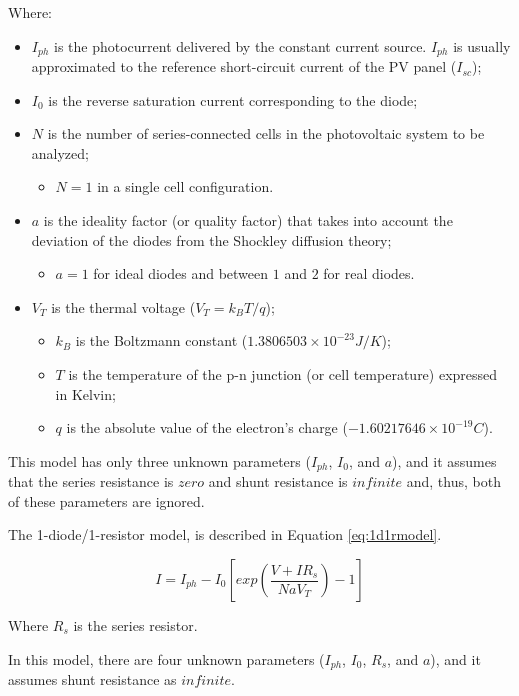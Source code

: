 Where:
\begin{itemize}
\item $I_{ph}$ is the photocurrent delivered by the constant current source. $I_{ph}$ is usually approximated to the reference short-circuit current of the PV panel ($I_{sc}$); 
\item $ I_{0} $ is the reverse saturation current corresponding to the diode; 
\item $ N $ is the number of series-connected cells in the photovoltaic system to be analyzed;
	\begin{itemize}
	\item $ N=1 $ in a single cell configuration. 	
	\end{itemize}	  
\item $ a $ is the ideality factor (or quality factor) that takes into account the deviation of the diodes from the Shockley diffusion theory; 
	\begin{itemize}
	\item $a=1$ for ideal diodes and between $ 1 $ and $ 2 $ for real diodes. 	
	\end{itemize}
\item $V_{T}$ is the thermal voltage ($ V_{T}=k_{B}T/q $);
	\begin{itemize}
	\item $ k_{B} $ is the Boltzmann constant ($ 1.3806503\times10^{-23}J/K $); 
	\item $ T $ is the temperature of the p-n junction (or cell temperature) expressed in Kelvin; 
	\item $ q $ is the absolute value of the electron's charge ($ -1.60217646\times10^{-19}C $).	
	\end{itemize}	 
\end{itemize}


This model has only three unknown parameters ($ I_{ph}$, $I_{0}$, and $a $), and it assumes that the series resistance is $ zero $ and shunt resistance is $ infinite $ and, thus, both of these parameters are ignored.
 
The 1-diode/1-resistor model, is described in Equation \ref{eq:1d1rmodel}. 

\begin{equation}
\label{eq:1d1rmodel}
I =I_{ph}-I_{0}\left[ exp \left( \dfrac{V+IR_{s}}{NaV_{T}} \right) -1 \right] 
\end{equation}

Where $R_{s}$ is the series resistor.

In this model, there are four unknown parameters ($ I_{ph}$, $I_{0}$, $ R_{s} $, and $ a $), and it assumes shunt resistance as $ infinite $.

